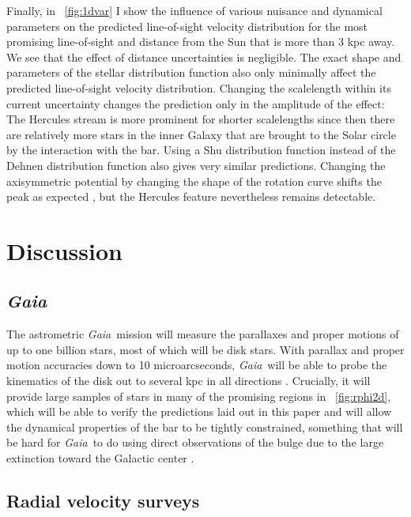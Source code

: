 \documentclass[12pt,preprint]{aastex}
\newcommand{\Gaia}{\emph{Gaia}}
\begin{document}
Finally, in \figurename~\ref{fig:1dvar} I show the influence of
various nuisance and dynamical parameters on the predicted
line-of-sight velocity distribution for the most promising
line-of-sight and distance from the Sun that is more than 3 kpc
away. We see that the effect of distance uncertainties is
negligible. The exact shape and parameters of the stellar distribution
function also only minimally affect the predicted line-of-sight
velocity distribution. Changing the scalelength within its current
uncertainty changes the prediction only in the amplitude of the
effect: The Hercules stream is more prominent for shorter scalelengths
since then there are relatively more stars in the inner Galaxy that
are brought to the Solar circle by the interaction with the bar. Using
a Shu distribution function \citep{shu69a} instead of the Dehnen
distribution function also gives very similar predictions. Changing
the axisymmetric potential by changing the shape of the rotation curve
shifts the peak as expected \citep[see][]{dehnen00a}, but the Hercules
feature nevertheless remains detectable. 



\section{Discussion}

\subsection{\Gaia}

The astrometric \Gaia\ mission will measure the parallaxes and proper
motions of up to one billion stars, most of which will be disk
stars. With parallax and proper motion accuracies down to 10
microarcseconds, \Gaia\ will be able to probe the kinematics of the
disk out to several kpc in all directions
\citep{bailerjones08a}. Crucially, it will provide large samples of
stars in many of the promising regions in
\figurename~\ref{fig:rphi2d}, which will be able to verify the
predictions laid out in this paper and will allow the dynamical
properties of the bar to be tightly constrained, something that will
be hard for \Gaia\ to do using direct observations of the bulge due to
the large extinction toward the Galactic center \citep{robin05a}. 



\subsection{Radial velocity surveys}
\end{document}
